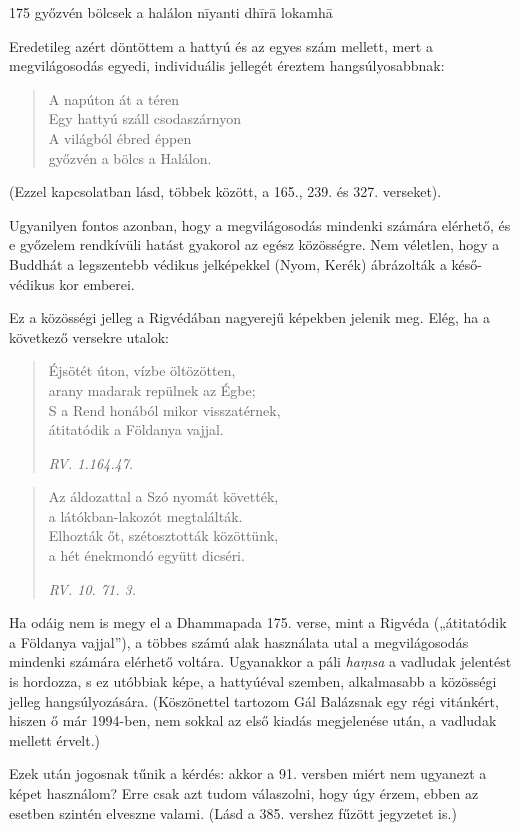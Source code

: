 
\begin{notesdescription}

\item[{175}
{győzvén bölcsek a halálon}
{nīyanti dhīrā lokamhā}] \hfill\par

Eredetileg azért döntöttem a hattyú és az egyes szám mellett, mert a megvilágosodás egyedi, individuális jellegét éreztem hangsúlyosabbnak:

\begin{verse}
A napúton át a téren\\
Egy hattyú száll csodaszárnyon\\
A világból ébred éppen\\
győzvén a bölcs a Halálon.
\end{verse}

(Ezzel kapcsolatban lásd, többek között, a 165., 239. és 327. verseket).

Ugyanilyen fontos azonban, hogy a megvilágosodás mindenki számára elérhető, és e győzelem rendkívüli hatást gyakorol az egész közösségre. Nem véletlen, hogy a Buddhát a legszentebb védikus jelképekkel (Nyom, Kerék) ábrázolták a késő-védikus kor emberei.

Ez a közösségi jelleg a Rigvédában nagyerejű képekben jelenik meg. Elég, ha a következő versekre utalok:

\begin{verse}
Éjsötét úton, vízbe öltözötten,\\
arany madarak repülnek az Égbe;\\
S a Rend honából mikor visszatérnek,\\
átitatódik a Földanya vajjal.

{\small\textit{RV. 1.164.47.}}
\end{verse}

\newpage

\begin{verse}
Az áldozattal a Szó nyomát követték,\\
a látókban-lakozót megtalálták.\\
Elhozták őt, szétosztották közöttünk,\\
a hét énekmondó együtt dicséri.

{\small\textit{RV. 10. 71. 3.}}
\end{verse}

Ha odáig nem is megy el a Dhammapada 175. verse, mint a Rigvéda („átitatódik a Földanya vajjal”), a többes számú alak használata utal a megvilágosodás mindenki számára elérhető voltára. Ugyanakkor a páli \textit{haṃsa} a vadludak jelentést is hordozza, s ez utóbbiak képe, a hattyúéval szemben, alkalmasabb a közösségi jelleg hangsúlyozására. (Köszönettel tartozom Gál Balázsnak egy régi vitánkért, hiszen ő már 1994-ben, nem sokkal az első kiadás megjelenése után, a vadludak mellett érvelt.)

Ezek után jogosnak tűnik a kérdés: akkor a 91. versben miért nem ugyanezt a képet használom? Erre csak azt tudom válaszolni, hogy úgy érzem, ebben az esetben szintén elveszne valami. (Lásd a 385. vershez fűzött jegyzetet is.)

\end{notesdescription}

